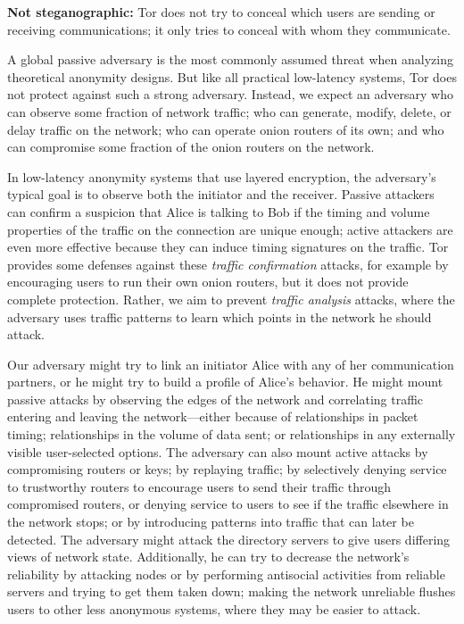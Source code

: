 \documentclass[times,10pt,twocolumn]{article}
\begin{document}
\textbf{Not steganographic:} Tor does not try to conceal which users are
sending or receiving communications; it only tries to conceal with whom
they communicate.

\label{subsec:threat-model}

A global passive adversary is the most commonly assumed threat when
analyzing theoretical anonymity designs. But like all practical
low-latency systems, Tor does not protect against such a strong
adversary. Instead, we expect an adversary who can observe some fraction
of network traffic; who can generate, modify, delete, or delay traffic
on the network; who can operate onion routers of its own; and who can
compromise some fraction of the onion routers on the network.


In low-latency anonymity systems that use layered encryption, the
adversary's typical goal is to observe both the initiator and the
receiver. Passive attackers can confirm a suspicion that Alice is
talking to Bob if the timing and volume properties of the traffic on the
connection are unique enough; active attackers are even more effective
because they can induce timing signatures on the traffic. Tor provides
some defenses against these \emph{traffic confirmation} attacks, for
example by encouraging users to run their own onion routers, but it does
not provide complete protection. Rather, we aim to prevent \emph{traffic
analysis} attacks, where the adversary uses traffic patterns to learn
which points in the network he should attack.

Our adversary might try to link an initiator Alice with any of her
communication partners, or he might try to build a profile of Alice's
behavior. He might mount passive attacks by observing the edges of the
network and correlating traffic entering and leaving the network---either
because of relationships in packet timing; relationships in the volume
of data sent; or relationships in any externally visible user-selected
options. The adversary can also mount active attacks by compromising
routers or keys; by replaying traffic; by selectively denying service
to trustworthy routers to encourage users to send their traffic through
compromised routers, or denying service to users to see if the traffic
elsewhere in the
network stops; or by introducing patterns into traffic that can later be
detected. The adversary might attack the directory servers to give users
differing views of network state. Additionally, he can try to decrease
the network's reliability by attacking nodes or by performing antisocial
activities from reliable servers and trying to get them taken down;
making the network unreliable flushes users to other less anonymous
systems, where they may be easier to attack.
\end{document}
